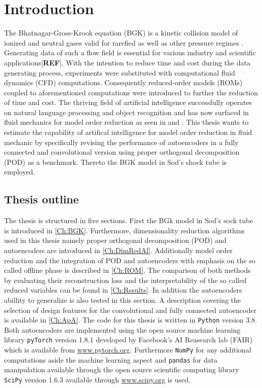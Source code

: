 
\chapter{Introduction}
\label{CH:intro}


The Bhatnagar-Gross-Krook equation (BGK) is a kinetic collision model of ionized and neutral gases valid for rarefied as well as other pressure regimes \cite{BGK}. Generating data of such a flow field is essential for various industry and scientific applications[\textbf{REF}]. With the intention to reduce time and cost during the data generating process, experiments were substituted with computational fluid dynamics (CFD) computations. Consequently reduced-order models (ROMs) coupled to aforementioned computations were introduced to further the reduction of time and cost. The thriving field of artificial intelligence successfully operates on natural language processing and object recognition and has now surfaced in fluid mechanics for model order reduction as seen in \cite{Carlberg} and \cite{bukka2020assessment}. This thesis wants to estimate the capability of artifical intelligence for model order reduction in fluid mechanic by specifically revising the performance of autoencoders in a fully connected and convolutional version using proper orthogonal decomposition (POD) as a benchmark. Thereto the BGK model in Sod's shock tube is employed.  
\section{Thesis outline}

The thesis is structured in five sections. First the BGk model in Sod's sock tube is introduced in \cref{Ch:BGK}. Furthermore, dimensionality reduction algorithms used in this thesis namely proper orthogonal decomposition (POD) and autoencoders are introduced in \cref{Ch:DimRedAl}. Additionally model order reduction and the integration of POD and autoencoders with emphasis on the so called offline phase is described in \cref{Ch:ROM}. The comparison of both methods by evaluating their reconstruction loss and the interpretability of the so called reduced variables can be found in \cref{Ch:Results}. In addition the autoencoders abillity to generalize is also tested in this section. A description covering the selection of design features for the convolutional and fully connected autoencoder is available in \cref{Ch:ApA}. The code for this thesis is written in \texttt{Python} version 3.8. Both autoencoders are implemented using the open source machine learning library \texttt{pyTorch} version 1.8.1 developed by Facebook's AI Reasearch lab (FAIR) which is available from \url{www.pytorch.org}. Furthermore \texttt{NumPy} for any additional computations aside the machine learning aspect and \texttt{pandas} for data manipulation available through the open source scientific computing library \texttt{SciPy} version 1.6.3 available through \url{www.scipy.org} is used.  

